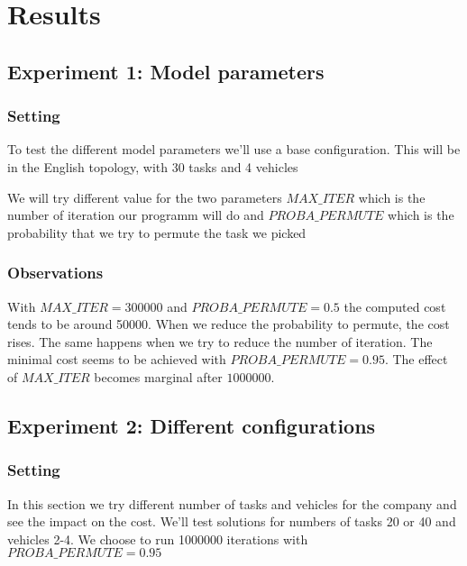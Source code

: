 \documentclass[11pt]{article}
\begin{document}
\section{Results}

\subsection{Experiment 1: Model parameters}

\subsubsection{Setting}
To test the different model parameters we'll use a base configuration. This will be in the English topology, with 30 tasks and 4 vehicles

We will try different value for the two parameters $MAX\_ITER$ which is the number of iteration our programm will do and $PROBA\_PERMUTE$ which is the probability that we try to permute the task we picked 

\subsubsection{Observations}
With $MAX\_ITER = 300000$ and $PROBA\_PERMUTE = 0.5$ the computed cost tends to be around 50000. When we reduce the probability to permute, the cost rises. The same happens when we try to reduce the number of iteration. The minimal cost seems to be achieved with $PROBA\_PERMUTE = 0.95$. The effect of $MAX\_ITER$ becomes marginal after $1000000$.

\subsection{Experiment 2: Different configurations}

\subsubsection{Setting}
In this section we try different number of tasks and vehicles for the company and see the impact on the cost. We'll test solutions for numbers of tasks 20 or 40 and vehicles 2-4. We choose to run 1000000 iterations with $PROBA\_PERMUTE = 0.95$
\end{document}
